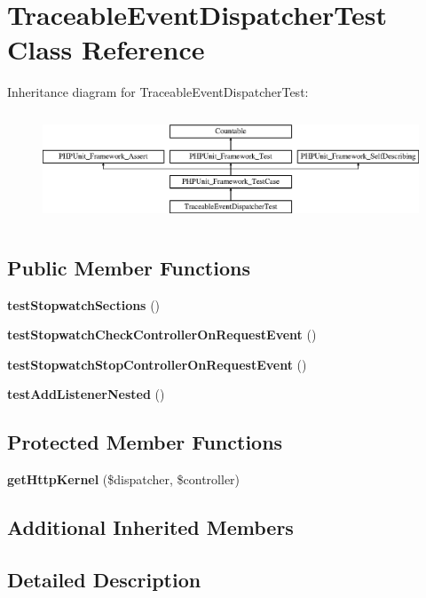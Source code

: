 \section{Traceable\+Event\+Dispatcher\+Test Class Reference}
\label{class_symfony_1_1_component_1_1_http_kernel_1_1_tests_1_1_debug_1_1_traceable_event_dispatcher_test}
Inheritance diagram for Traceable\+Event\+Dispatcher\+Test\+:\begin{figure}[H]
\begin{center}
\leavevmode
\includegraphics[height=3.303835cm]{class_symfony_1_1_component_1_1_http_kernel_1_1_tests_1_1_debug_1_1_traceable_event_dispatcher_test}
\end{center}
\end{figure}
\subsection*{Public Member Functions}
\begin{DoxyCompactItemize}
\item 
{\bf test\+Stopwatch\+Sections} ()
\item 
{\bf test\+Stopwatch\+Check\+Controller\+On\+Request\+Event} ()
\item 
{\bf test\+Stopwatch\+Stop\+Controller\+On\+Request\+Event} ()
\item 
{\bf test\+Add\+Listener\+Nested} ()
\end{DoxyCompactItemize}
\subsection*{Protected Member Functions}
\begin{DoxyCompactItemize}
\item 
{\bf get\+Http\+Kernel} (\$dispatcher, \$controller)
\end{DoxyCompactItemize}
\subsection*{Additional Inherited Members}


\subsection{Detailed Description}


